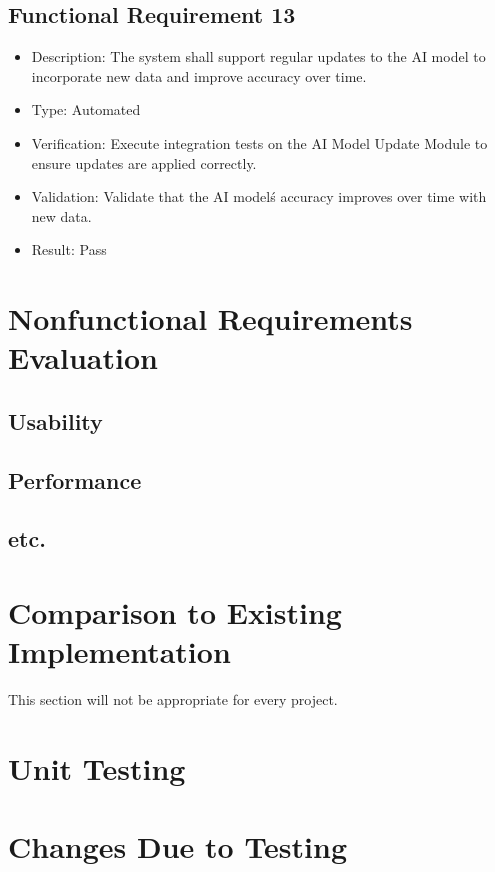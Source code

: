 \documentclass[12pt, titlepage]{article}
\begin{document}
\subsection{Functional Requirement 13}
\begin{itemize}  
  \item Description: The system shall support regular updates to the AI model to incorporate new data and improve accuracy over time.
  \item Type: Automated
  \item Verification: Execute integration tests on the AI Model Update Module to ensure updates are applied correctly.
  \item Validation: Validate that the AI model\'s accuracy improves over time with new data.
  \item Result: Pass
\end{itemize}

\section{Nonfunctional Requirements Evaluation}

\subsection{Usability}
		
\subsection{Performance}

\subsection{etc.}
	
\section{Comparison to Existing Implementation}	

This section will not be appropriate for every project.

\section{Unit Testing}

\section{Changes Due to Testing}
\end{document}
